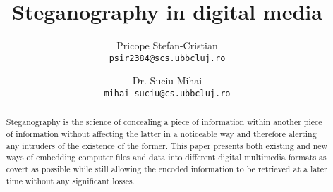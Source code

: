 \documentclass[notitlepage]{report}
\begin{document}
\pretitle{\begin{center}\Huge\bfseries\vspace*{5em}}
\posttitle{\par\end{center}\vskip 0.5em}
\postdate{\end{center}\vspace*{7em}}

\title{Steganography in digital media}

\author{
	Pricope Stefan-Cristian\\
	\texttt{psir2384@scs.ubbcluj.ro}
  	\and
  	Dr. Suciu Mihai\\
  	\texttt{mihai-suciu@cs.ubbcluj.ro}
}
\date{\vspace{-6ex}}
\maketitle
\thispagestyle{empty}

\begin{abstract}
Steganography is the science of concealing a piece of information within another piece of information without affecting the latter in a noticeable way and therefore alerting any intruders of the existence of the former. 
This paper presents both existing and new ways of embedding computer files and data into different digital multimedia formats as covert as possible while still allowing the encoded information to be retrieved at a later time without any significant losses.
\end{abstract}


\tableofcontents{}






\end{document}
